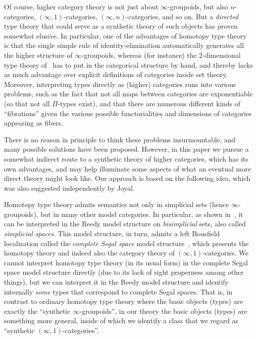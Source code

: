 \documentclass[12pt]{amsart}
\theoremstyle{plain}
\theoremstyle{definition}
\theoremstyle{remark}
\numberwithin{equation}{section}
\begin{document}
Of course, higher category theory is not just about $\infty$-groupoids, but also $n$-categories, $(\infty,1)$-categories, $(\infty,n)$-categories, and so on.
But a \emph{directed} type theory that could serve as a synthetic theory of such objects has proven somewhat elusive.
In particular, one of the advantages of homotopy type theory is that the single simple rule of identity-elimination automatically generates all the higher structure of $\infty$-groupoids, whereas (for instance) the 2-dimensional type theory of~\cite{2dtt} has to put in the categorical structure by hand, and thereby lacks as much advantage over explicit definitions of categories inside set theory.
Moreover, interpreting types directly as (higher) categories runs into various problems, such as the fact that not all maps between categories are exponentiable (so that not all $\Pi$-types exist), and that there are numerous different kinds of ``fibrations'' given the various possible functorialities and dimensions of categories appearing as fibers.

There is no reason in principle to think these problems insurmountable, and many possible solutions have been proposed.
However, in this paper we pursue a somewhat indirect route to a synthetic theory of higher categories, which has its own advantages, and may help illuminate some aspects of what an eventual more direct theory might look like.
Our approach is based on the following idea, which was also suggested independently by Joyal.

Homotopy type theory admits semantics not only in simplicial sets (hence $\infty$-groupoids), but in many other model categories.
In particular, as shown in~\cite{elreedy}, it can be interpreted in the Reedy model structure on \emph{bisimplicial} sets, also called \emph{simplicial spaces}.
This model structure, in turn, admits a left Bousfield localization called the \emph{complete Segal space} model structure~\cite{css}, which presents the homotopy theory and indeed also the category theory \cite{RV4} of $(\infty,1)$-categories.
We cannot interpret homotopy type theory (in its usual form) in the complete Segal space model structure directly (due to its lack of right properness among other things), but we can interpret it in the Reedy model structure and identify internally \emph{some} types that correspond to complete Segal spaces.
That is, in contrast to ordinary homotopy type theory where the basic objects (types) are exactly the ``synthetic $\infty$-groupoids'', in our theory the basic objects (types) are something more general, inside of which we identify a class that we regard as ``synthetic $(\infty,1)$-categories''.
\end{document}
